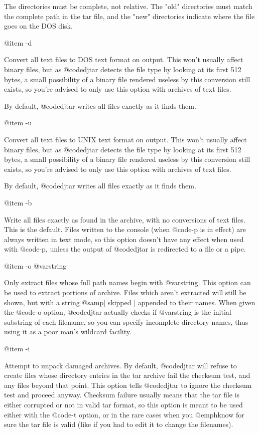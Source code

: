 The directories must be complete, not relative.  The "old" directories
must match the complete path in the tar file, and the "new" directories
indicate where the file goes on the DOS disk.

@item -d

Convert all text files to DOS text format on output.  This won't usually
affect binary files, but as @code{djtar} detects the file type by looking
at its first 512 bytes, a small possibility of a binary file rendered
useless by this conversion still exists, so you're advised to only use
this option with archives of text files.

By default, @code{djtar} writes all files exactly as it finds them.

@item -u

Convert all text files to UNIX text format on output.  This won't usually
affect binary files, but as @code{djtar} detects the file type by looking
at its first 512 bytes, a small possibility of a binary file rendered
useless by this conversion still exists, so you're advised to only use
this option with archives of text files.

By default, @code{djtar} writes all files exactly as it finds them.

@item -b

Write all files exactly as found in the archive, with no conversions of
text files.  This is the default.
Files written to the console (when @code{-p} is in effect) are always
written in text mode, so this option doesn't have any effect when used
with @code{-p}, unless the output of @code{djtar} is redirected to a file
or a pipe.

@item -o @var{string}

Only extract files whose full path names begin with @var{string}.
This option can be used to extract portions of archive.  Files which aren't
extracted will still be shown, but with a string @samp{[ skipped ]}
appended to their names.  When given the @code{-o} option, @code{djtar}
actually checks if @var{string} is the initial substring of each filename,
so you can specify incomplete directory names, thus using it as a poor man's
wildcard facility.

@item -i

Attempt to unpack damaged archives.
By default, @code{djtar} will refuse to create files whose directory
entries in the tar archive fail the checksum test, and any files beyond
that point.  This option tells @code{djtar} to ignore the checksum test
and proceed anyway.  Checksum failure usually means that the tar file is
either corrupted or not in valid tar format, so this option is meant to be
used either with the @code{-t} option, or in the rare cases when you
@emph{know} for sure the tar file is valid (like if you had to edit it to
change the filenames).

